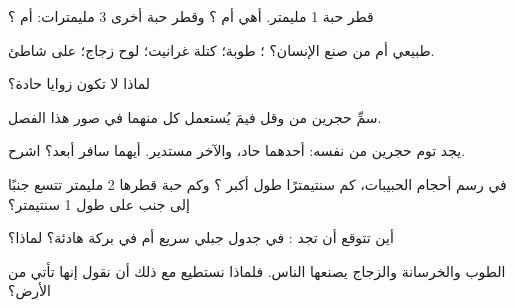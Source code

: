 \begin{exercise}[$\star$]\label{exo:g3:stones-pebbles-sand:3}
قطر حبة 1 مليمتر. أهي  أم ؟ وقطر حبة أخرى
3 مليمترات:  أم ؟
\end{exercise}

\begin{exercise}[$\star$]\label{exo:g3:stones-pebbles-sand:4}
طبيعي أم من صنع الإنسان؟ ؛ طوبة؛ كتلة غرانيت؛ لوح
زجاج؛  على شاطئ.
\end{exercise}

\begin{exercise}[$\star$]\label{exo:g3:stones-pebbles-sand:5}
لماذا لا تكون   زوايا حادة؟
\end{exercise}

\begin{exercise}[$\star$]\label{exo:g3:stones-pebbles-sand:6}
سمِّ حجرين من  وقل فيمَ يُستعمل كل منهما في صور
هذا الفصل.
\end{exercise}

\begin{exercise}[$\star\star$]\label{exo:g3:stones-pebbles-sand:7}
يجد توم حجرين من  نفسه: أحدهما حاد، والآخر مستدير.
أيهما سافر أبعد؟ اشرح.
\end{exercise}

\begin{exercise}[$\star\star$]\label{exo:g3:stones-pebbles-sand:8}
في رسم أحجام الحبيبات، كم سنتيمترًا طول أكبر ؟
وكم حبة  قطرها 2 مليمتر تتسع جنبًا إلى جنب على طول 1
سنتيمتر؟
\end{exercise}

\begin{exercise}[$\star\star$]\label{exo:g3:stones-pebbles-sand:9}
أين تتوقع أن تجد : في جدول جبلي سريع أم في بركة
هادئة؟ لماذا؟
\end{exercise}

\begin{exercise}[$\star\star$]\label{exo:g3:stones-pebbles-sand:10}
الطوب والخرسانة والزجاج يصنعها الناس. فلماذا نستطيع مع ذلك أن نقول إنها
تأتي من  الأرض؟
\end{exercise}
